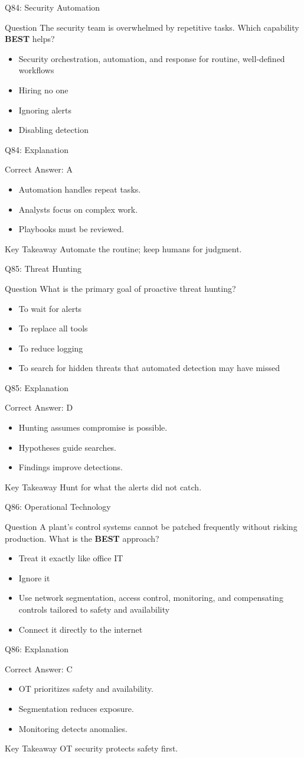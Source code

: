 \documentclass[aspectratio=169]{beamer}
\newcommand{\hq}[7]{%
	\begin{frame}{Q#1: #2}
		\begin{block}{Question}
			#3
		\end{block}
		\begin{itemize}
			#4
		\end{itemize}
	\end{frame}
	\begin{frame}{Q#1: Explanation}
		\begin{block}{Correct Answer: #5}
			\begin{itemize}
				#6
			\end{itemize}
		\end{block}
		\begin{alertblock}{Key Takeaway}
			#7
		\end{alertblock}
	\end{frame}
}
\begin{document}
	\hq{84}{Security Automation}
	{The security team is overwhelmed by repetitive tasks. Which capability \textbf{BEST} helps?}
	{\item[\textbf{(A)}] Security orchestration, automation, and response for routine, well-defined workflows
		\item[\textbf{(B)}] Hiring no one
		\item[\textbf{(C)}] Ignoring alerts
		\item[\textbf{(D)}] Disabling detection}
	{A}
	{\item Automation handles repeat tasks.
		\item Analysts focus on complex work.
		\item Playbooks must be reviewed.}
	{Automate the routine; keep humans for judgment.}

	\hq{85}{Threat Hunting}
	{What is the primary goal of proactive threat hunting?}
	{\item[\textbf{(A)}] To wait for alerts
		\item[\textbf{(B)}] To replace all tools
		\item[\textbf{(C)}] To reduce logging
		\item[\textbf{(D)}] To search for hidden threats that automated detection may have missed}
	{D}
	{\item Hunting assumes compromise is possible.
		\item Hypotheses guide searches.
		\item Findings improve detections.}
	{Hunt for what the alerts did not catch.}

	\hq{86}{Operational Technology}
	{A plant's control systems cannot be patched frequently without risking production. What is the \textbf{BEST} approach?}
	{\item[\textbf{(A)}] Treat it exactly like office IT
		\item[\textbf{(B)}] Ignore it
		\item[\textbf{(C)}] Use network segmentation, access control, monitoring, and compensating controls tailored to safety and availability
		\item[\textbf{(D)}] Connect it directly to the internet}
	{C}
	{\item OT prioritizes safety and availability.
		\item Segmentation reduces exposure.
		\item Monitoring detects anomalies.}
	{OT security protects safety first.}
\end{document}
